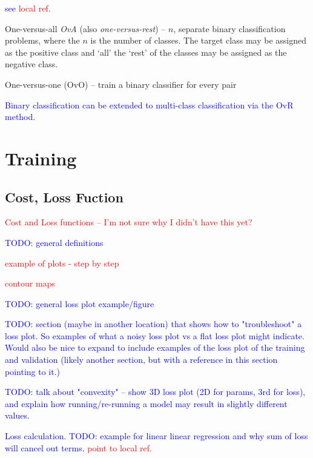 \textcolor{blue}{see \textcolor{red}{local ref}.}

One-versus-all \emph{OvA} (also \emph{one-versus-rest}) -- $n$, separate binary classification problems, where the $n$ is the number of classes. The target class may be assigned as the positive class and `all' the `rest' of the classes may be assigned as the negative class.

One-versus-one (OvO) -- train a binary classifier for every pair


\textcolor{blue}{Binary classification can be extended to multi-class classification via the OvR method.}


\section{Training}

\subsection{Cost, Loss Fuction}

\textcolor{red}{Cost and Loss functions -- I'm not sure why I didn't have this yet?}

\textcolor{blue}{TODO: general definitions}

\textcolor{red}{example of plots - step by step}

\textcolor{red}{contour maps}

\textcolor{blue}{TODO: general loss plot example/figure}

\textcolor{blue}{TODO: section (maybe in another location) that shows how to "troubleshoot" a loss plot. So examples of what a noisy loss plot vs a flat loss plot might indicate. Would also be nice to expand to include examples of the loss plot of the training and validation (likely another section, but with a reference in this section pointing to it.)}

\textcolor{blue}{TODO: talk about "convexity" -- show 3D loss plot (2D for params, 3rd for loss), and explain how running/re-running a model may result in slightly different values.}

\textcolor{blue}{Loss calculation. TODO: example for linear linear regression and why sum of loss will cancel out terms. \textcolor{red}{point to local ref.}}

